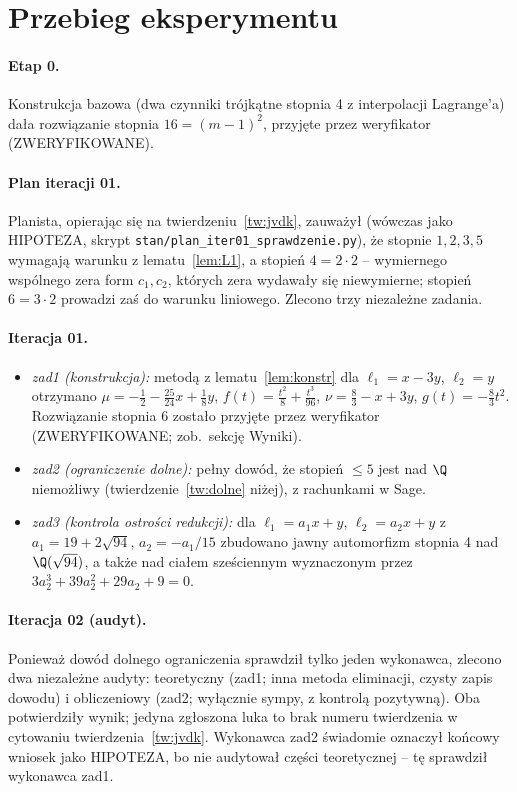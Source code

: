 \section{Przebieg eksperymentu}

\paragraph{Etap 0.} Konstrukcja bazowa (dwa czynniki trójkątne stopnia 4 z interpolacji
Lagrange'a) dała rozwiązanie stopnia $16=(m-1)^2$, przyjęte przez weryfikator (ZWERYFIKOWANE).

\paragraph{Plan iteracji 01.} Planista, opierając się na twierdzeniu~\ref{tw:jvdk}, zauważył
(wówczas jako HIPOTEZA, skrypt \texttt{stan/plan\_iter01\_sprawdzenie.py}), że stopnie $1,2,3,5$
wymagają warunku z lematu~\ref{lem:L1}, a stopień $4=2\cdot2$ -- wymiernego wspólnego zera form
$c_1,c_2$, których zera wydawały się niewymierne; stopień $6=3\cdot2$ prowadzi zaś do warunku
liniowego. Zlecono trzy niezależne zadania.

\paragraph{Iteracja 01.}
\begin{itemize}
\item \emph{zad1 (konstrukcja):} metodą z lematu~\ref{lem:konstr} dla $\ell_1=x-3y$, $\ell_2=y$
  otrzymano $\mu=-\tfrac12-\tfrac{25}{24}x+\tfrac18y$, $f(t)=\tfrac{t^2}{8}+\tfrac{t^3}{96}$,
  $\nu=\tfrac83-x+3y$, $g(t)=-\tfrac83t^2$. Rozwiązanie stopnia 6 zostało przyjęte przez
  weryfikator (ZWERYFIKOWANE; zob.\ sekcję Wyniki).
\item \emph{zad2 (ograniczenie dolne):} pełny dowód, że stopień $\le5$ jest nad $\Q$ niemożliwy
  (twierdzenie~\ref{tw:dolne} niżej), z rachunkami w Sage.
\item \emph{zad3 (kontrola ostrości redukcji):} dla $\ell_1=a_1x+y$, $\ell_2=a_2x+y$ z
  $a_1=19+2\sqrt{94}$, $a_2=-a_1/15$ zbudowano jawny automorfizm stopnia 4 nad $\Q(\sqrt{94})$,
  a także nad ciałem sześciennym wyznaczonym przez $3a_2^3+39a_2^2+29a_2+9=0$.
\end{itemize}

\paragraph{Iteracja 02 (audyt).} Ponieważ dowód dolnego ograniczenia sprawdził tylko jeden wykonawca,
zlecono dwa niezależne audyty: teoretyczny (zad1; inna metoda eliminacji, czysty zapis dowodu) i
obliczeniowy (zad2; wyłącznie sympy, z kontrolą pozytywną). Oba potwierdziły wynik; jedyna
zgłoszona luka to brak numeru twierdzenia w cytowaniu twierdzenia~\ref{tw:jvdk}. Wykonawca zad2
świadomie oznaczył końcowy wniosek jako HIPOTEZA, bo nie audytował części teoretycznej -- tę
sprawdził wykonawca zad1.


